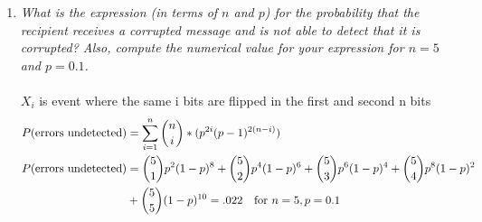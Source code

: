 \documentclass{article} %
\begin{document}
\begin{enumerate}
\begin{enumerate}
		\item \textit{What is the expression (in terms of $n$ and $p$) for the probability that the recipient receives a corrupted message and is not able to detect that it is corrupted? Also, compute the numerical value for your expression for $n = 5$ and $p = 0.1$.}\\
		\\	
		$X_i$ is event where the same i bits are flipped in the first and second n bits		
		\begin{align*}
		P(\text{errors undetected}) &= \sum_{i=1}^{n} \binom{n}{i} * (p^{2i}(p - 1)^{2(n - i)})\\
		P(\text{errors undetected}) &= \binom{5}{1}p^2(1 - p)^8 + \binom{5}{2}p^4(1 - p)^6 +  \binom{5}{3}p^6(1 - p)^4 + \binom{5}{4}p^8(1 - p)^2\\
		&+ \binom{5}{5}(1 - p)^{10} = .022 \text{\quad for } n = 5, p = 0.1
		\end{align*}
			
	\end{enumerate}
	

\end{enumerate}
\end{document}
